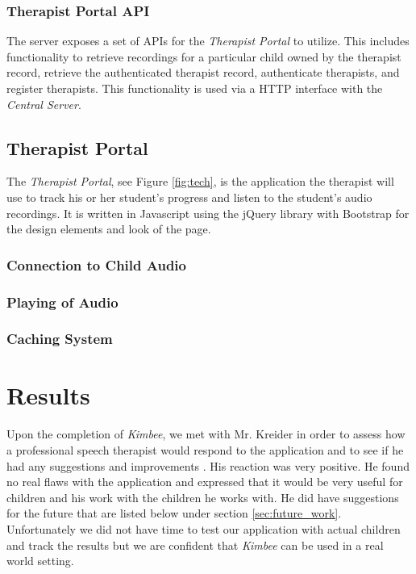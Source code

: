 \documentclass{sig-alternate-2013}
\begin{document}
\subsubsection{Therapist Portal API}
  The server exposes a set of APIs for the {\em Therapist Portal} to utilize. This includes functionality to retrieve recordings for a particular child owned by the therapist record, retrieve the authenticated therapist record, authenticate therapists, and register therapists. This functionality is used via a HTTP interface with the {\em Central Server}.

\subsection{Therapist Portal}

The {\em Therapist Portal}, see Figure \ref{fig:tech}, is the application the therapist will use to track his or her student's progress and listen to the student's audio recordings. It is written in Javascript using the jQuery library with Bootstrap for the design elements and look of the page.

\subsubsection{Connection to Child Audio}

\subsubsection{Playing of Audio}

\subsubsection{Caching System}

\section{Results}

Upon the completion of {\em Kimbee}, we met with Mr. Kreider in order to assess how a professional speech therapist would respond to the application and to see if he had any suggestions and improvements \cite{Kreider:Results}. His reaction was very positive. He found no real flaws with the application and expressed that it would be very useful for children and his work with the children he works with. He did have suggestions for the future that are listed below under section \ref{sec:future_work}. Unfortunately we did not have time to test our application with actual children and track the results but we are confident that {\em Kimbee} can be used in a real world setting.
\end{document}
